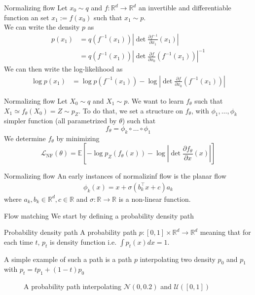 \documentclass{beamer}
\begin{document}
\begin{frame}{Normalizing flow}
    Let \(x_0\sim q\) and \(f:\mathbb{R}^d\rightarrow\mathbb{R}^d\) an invertible and differentiable function an set  \(x_1:=f(x_0)\) such that \(x_1\sim p\).\\
    We can write the density \(p\) as
    \begin{align}
        p(x_1) &= q(f^{-1}(x_1))\left| \det \frac{\partial f^{-1}}{\partial x_1}(x_1)\right|\\
        &= q(f^{-1}(x_1))\left| \det \frac{\partial f}{\partial x_0}(f^{-1}(x_1))\right|^{-1} 
    \end{align}
    We can then write the log-likelihood as
    \begin{align}
        \log p(x_1) &= \log p(f^{-1}(x_1))-\log \left| \det \frac{\partial f}{\partial x_0}(f^{-1}(x_1))\right|
    \end{align}
\end{frame}

\begin{frame}{Normalizing flow}
    Let \(X_0\sim q\) and \(X_1\sim p\). We want to learn \(f_\theta\) such that \(X_1 \simeq f_\theta(X_0)=Z\sim p_Z\). To do that, we set a structure on \(f_\theta\), with \(\phi_1,\ldots,\phi_k\) simpler function (all parametrized by \(\theta\)) such that 
    \[f_\theta=\phi_k\circ\ldots\circ \phi_1\] 
    We determine \(f_\theta\) by minimizing 
    \[\mathcal{L}_\text{NF}(\theta)= \mathbb{E}\left[-\log p_Z(f_\theta(x))-\log \left|\det \frac{\partial f_\theta}{\partial x}(x)\right|\right]\]
\end{frame}

\begin{frame}{Normalizing flow}
    An early instances  of normalizinf flow is the planar flow 
    \begin{align*}
        \phi_k(x)=x+\sigma(b_k^\intercal x+c)a_k
    \end{align*}
    where \(a_k,b_k\in\mathbb{R}^d, c\in\mathbb{R}\) and  \(\sigma:\mathbb{R}\rightarrow\mathbb{R}\) is a non-linear function.
\end{frame}

\begin{frame}{Flow matching}
    We start by defining a probability density path
    \begin{block}{Probability density path}
        A probability path \(p:[0,1]\times\mathbb{R}^d\rightarrow\mathbb{R}^d\) meaning that for each time \(t\), \(p_t\) is density function i.e. \(\int p_t(x)dx=1\).\\
    \end{block}
    A simple example of such a path is a path \(p\) interpolating two density \(p_0\) and \(p_1\) with \(p_t=tp_1+(1-t)p_0\)
    \begin{figure}[htbp]
        \centering
        \caption{A probability path interpolating $\mathcal{N}(0,0.2)$ and $\mathcal{U}([0,1])$}
    \end{figure}
\end{frame}
\end{document}
